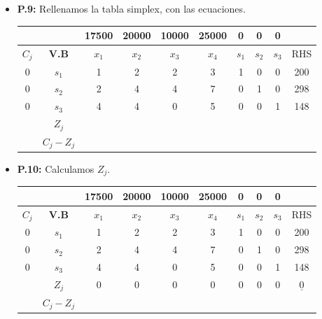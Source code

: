 \documentclass{templateNote}
\begin{document}
\begin{itemize}
    \item \textbf{P.9:} Rellenamos la tabla simplex, con las ecuaciones.
    \begin{center}
        \begin{tabular}{|c|c|c|c|c|c|c|c|c|c|}
            \hline
            & & 17500 & 20000 & 10000 & 25000 & 0 & 0 & 0 & \\ \hline
            $C_j$ & \textbf{V.B} & $x_1$ & $x_2$ & $x_3$ & $x_4$ & $s_1$ & $s_2$ & $s_3$ & RHS \\ \hline
            0 & $s_1$ & 1 & 2 & 2 & 3 & 1 & 0 & 0 & 200 \\
            0 & $s_2$ & 2 & 4 & 4 & 7 & 0 & 1 & 0 & 298 \\
            0 & $s_3$ & 4 & 4 & 0 & 5 & 0 & 0 & 1 & 148 \\ \hline
            & $Z_j$ & & & & & & & & \\ \hline
            & $C_j - Z_j$ & & & & & & & & \\ \hline
        \end{tabular}
    \end{center}

    \item \textbf{P.10:} Calculamos $Z_j$.
    \begin{center}
        \begin{tabular}{|c|c|c|c|c|c|c|c|c|c|}
            \hline
            & & 17500 & 20000 & 10000 & 25000 & 0 & 0 & 0 & \\ \hline
            $C_j$ & \textbf{V.B} & $x_1$ & $x_2$ & $x_3$ & $x_4$ & $s_1$ & $s_2$ & $s_3$ & RHS \\ \hline
            0 & $s_1$ & 1 & 2 & 2 & 3 & 1 & 0 & 0 & 200 \\
            0 & $s_2$ & 2 & 4 & 4 & 7 & 0 & 1 & 0 & 298 \\
            0 & $s_3$ & 4 & 4 & 0 & 5 & 0 & 0 & 1 & 148 \\ \hline
            & $Z_j$ & 0 & 0 & 0 & 0 & 0 & 0 & 0 & $\underline{0}$ \\ \hline
            & $C_j - Z_j$ & & & & & & & & \\ \hline
        \end{tabular}
    \end{center}


\end{itemize}
\end{document}
